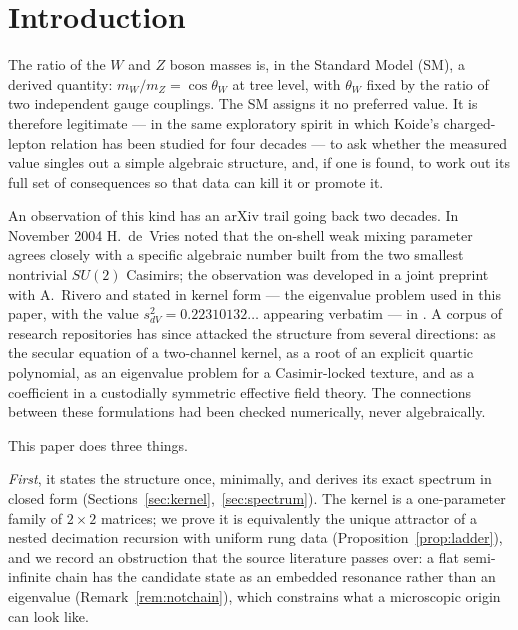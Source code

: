 \documentclass[11pt,a4paper]{article}
\theoremstyle{definition}
\begin{document}
\section{Introduction}
\label{sec:intro}

The ratio of the $W$ and $Z$ boson masses is, in the Standard Model (SM), a
derived quantity: $m_W/m_Z=\cos\theta_W$ at tree level, with $\theta_W$
fixed by the ratio of two independent gauge couplings. The SM assigns it no
preferred value. It is therefore legitimate --- in the same exploratory
spirit in which Koide's charged-lepton relation has been studied for four
decades \cite{koide1982,koide1983prd,koide1990,koide2005,koide2018,foot1994}
--- to ask whether the measured value singles out a simple algebraic
structure, and, if one is found, to work out its full set of consequences so
that data can kill it or promote it.

An observation of this kind has an arXiv trail going back two decades. In
November 2004 H.~de~Vries noted \cite{devries2004} that the on-shell weak
mixing parameter agrees closely with a specific algebraic number built from
the two smallest nontrivial $SU(2)$ Casimirs; the observation was developed
in a joint preprint with A.~Rivero \cite{devriesrivero2005} and stated in
kernel form --- the eigenvalue problem used in this paper, with the value
$s^2_{dV}=0.22310132\ldots$ appearing verbatim --- in \cite{rivero2006}. A
corpus of research repositories has since attacked the structure from
several directions: as the secular equation of a two-channel kernel, as a
root of an explicit quartic polynomial, as an eigenvalue problem for a
Casimir-locked texture, and as a coefficient in a custodially symmetric
effective field theory. The connections between these formulations had been
checked numerically, never algebraically.

This paper does three things.

\emph{First}, it states the structure once, minimally, and derives its exact
spectrum in closed form (Sections~\ref{sec:kernel},~\ref{sec:spectrum}).
The kernel is a one-parameter family of $2\times2$ matrices; we prove it is
equivalently the unique attractor of a nested decimation recursion with
uniform rung data (Proposition~\ref{prop:ladder}), and we record an
obstruction that the source literature passes over: a flat semi-infinite
chain has the candidate state as an embedded resonance rather than an
eigenvalue (Remark~\ref{rem:notchain}), which constrains what a microscopic
origin can look like.
\end{document}
